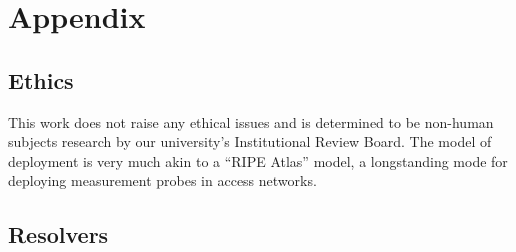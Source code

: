 \appendix
\section{Appendix}

\subsection{Ethics}
This work does not raise any ethical issues and 
is determined to be non-human subjects research by our university's
Institutional Review Board.  The model of deployment is very much akin to a
``RIPE Atlas'' model, a longstanding mode for deploying measurement probes in
access networks.

\subsection{Resolvers}\label{sec:resolvers}
